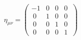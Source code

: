 \documentclass[preview]{standalone}
\begin{document}
\begin{align*}
\eta_{\mu \nu} = \begin{pmatrix} -1 & 0 & 0 & 0 \\ \
                                            0 & 1 & 0 & 0 \\ \
                                            0 & 0 & 1 & 0 \\ \
                                            0 & 0 & 0 & 1 \
                                            \end{pmatrix}
\end{align*}
\end{document}

